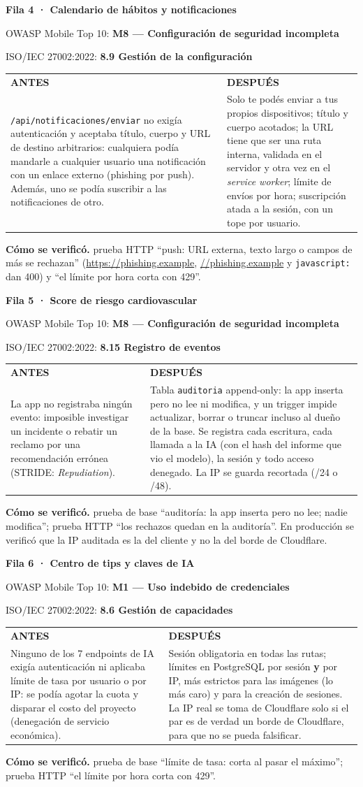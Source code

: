 \documentclass[11pt,letterpaper]{article}
\makeatletter
\newcommand{\cod}[1]{\texttt{#1}}
\newcommand{\fila}[7]{%
  \par\vspace{8pt}\noindent
  \begin{minipage}{\linewidth}%
  {\large\bfseries\color{tinta}Fila #1 · #2}\par\vspace{2pt}
  {\small\color{gris}OWASP Mobile Top 10: \textbf{#3}\par
   ISO/IEC 27002:2022: \textbf{#4}\par}\vspace{4pt}
  \renewcommand{\arraystretch}{1.25}%
  \begin{tabularx}{\linewidth}{@{}>{\raggedright\arraybackslash\small}X@{\hspace{6pt}}>{\raggedright\arraybackslash\small}X@{}}
    \cellcolor{antesbg}\textbf{\color{antes}ANTES} & \cellcolor{despuesbg}\textbf{\color{despues}DESPUÉS} \\
    \cellcolor{antesbg}#5 & \cellcolor{despuesbg}#6 \\
  \end{tabularx}\par\vspace{3pt}
  {\small\textbf{Cómo se verificó.} #7}\par
  \end{minipage}\par\vspace{4pt}
}
\makeatother
\begin{document}
\fila{4}{Calendario de hábitos y notificaciones}{M8 — Configuración de seguridad incompleta}{8.9 Gestión de la configuración}
{\cod{/api/notificaciones/enviar} no exigía autenticación y aceptaba título, cuerpo y URL de destino arbitrarios: cualquiera podía mandarle a cualquier usuario una notificación con un enlace externo (phishing por push). Además, uno se podía suscribir a las notificaciones de otro.}
{Solo te podés enviar a tus propios dispositivos; título y cuerpo acotados; la URL tiene que ser una ruta interna, validada en el servidor y otra vez en el \textit{service worker}; límite de envíos por hora; suscripción atada a la sesión, con un tope por usuario.}
{prueba HTTP ``push: URL externa, texto largo o campos de más se rechazan'' (\url{https://phishing.example}, \url{//phishing.example} y \cod{javascript:} dan 400) y ``el límite por hora corta con 429''.}

\fila{5}{Score de riesgo cardiovascular}{M8 — Configuración de seguridad incompleta}{8.15 Registro de eventos}
{La app no registraba ningún evento: imposible investigar un incidente o rebatir un reclamo por una recomendación errónea (STRIDE: \textit{Repudiation}).}
{Tabla \cod{auditoria} append-only: la app inserta pero no lee ni modifica, y un trigger impide actualizar, borrar o truncar incluso al dueño de la base. Se registra cada escritura, cada llamada a la IA (con el hash del informe que vio el modelo), la sesión y todo acceso denegado. La IP se guarda recortada (/24 o /48).}
{prueba de base ``auditoría: la app inserta pero no lee; nadie modifica''; prueba HTTP ``los rechazos quedan en la auditoría''. En producción se verificó que la IP auditada es la del cliente y no la del borde de Cloudflare.}

\fila{6}{Centro de tips y claves de IA}{M1 — Uso indebido de credenciales}{8.6 Gestión de capacidades}
{Ninguno de los 7 endpoints de IA exigía autenticación ni aplicaba límite de tasa por usuario o por IP: se podía agotar la cuota y disparar el costo del proyecto (denegación de servicio económica).}
{Sesión obligatoria en todas las rutas; límites en PostgreSQL por sesión \textbf{y} por IP, más estrictos para las imágenes (lo más caro) y para la creación de sesiones. La IP real se toma de Cloudflare solo si el par es de verdad un borde de Cloudflare, para que no se pueda falsificar.}
{prueba de base ``límite de tasa: corta al pasar el máximo''; prueba HTTP ``el límite por hora corta con 429''.}
\end{document}
